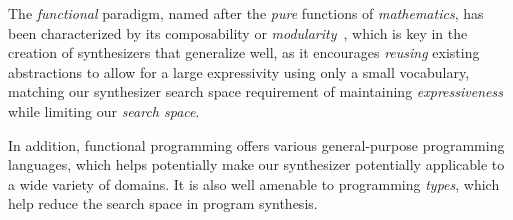 \documentclass{article}
\begin{document}

The \emph{functional} paradigm,
named after the \emph{pure} functions of \emph{mathematics},
has been characterized by its composability or \emph{modularity}~\citep{hughes1989functional},
which is key in the creation of synthesizers that generalize well,
as it encourages \emph{reusing} existing abstractions to allow for a large expressivity using only a small vocabulary,
matching our synthesizer search space requirement of maintaining \emph{expressiveness} while limiting our \emph{search space}.

In addition, functional programming offers various general-purpose programming languages,
which helps potentially make our synthesizer potentially applicable to a wide variety of domains.
It is also well amenable to programming \emph{types},
which help reduce the search space in program synthesis.
\end{document}
